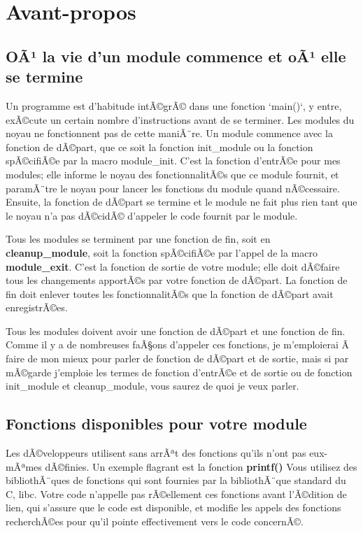 \documentclass[11pt]{article}
\begin{document}
\section*{Avant-propos}
\label{sec-5}

\subsection*{OÃ¹ la vie d'un module commence et oÃ¹ elle se termine}
\label{sec-5-1}

Un programme est d'habitude intÃ©grÃ© dans une fonction `main()`, y entre, exÃ©cute un certain nombre d'instructions avant de se terminer. Les modules du noyau ne fonctionnent pas de cette maniÃ¨re. Un module commence avec la fonction de dÃ©part, que ce soit la fonction init\_module ou la fonction spÃ©cifiÃ©e par la macro module\_init. C'est la fonction d'entrÃ©e pour mes modules; elle informe le noyau des fonctionnalitÃ©s que ce module fournit, et paramÃ¨tre le noyau pour lancer les fonctions du module quand nÃ©cessaire. Ensuite, la fonction de dÃ©part se termine et le module ne fait plus rien tant que le noyau n'a pas dÃ©cidÃ© d'appeler le code fournit par le module.

Tous les modules se terminent par une fonction de fin, soit en \textbf{cleanup\_module}, soit la fonction spÃ©cifiÃ©e par l'appel de la macro \textbf{module\_exit}. C'est la fonction de sortie de votre module; elle doit dÃ©faire tous les changements apportÃ©s par votre fonction de dÃ©part. La fonction de fin doit enlever toutes les fonctionnalitÃ©s que la fonction de dÃ©part avait enregistrÃ©es.

Tous les modules doivent avoir une fonction de dÃ©part et une fonction de fin. Comme il y a de nombreuses faÃ§ons d'appeler ces fonctions, je m'emploierai Ã  faire de mon mieux pour parler de fonction de dÃ©part et de sortie, mais si par mÃ©garde j'emploie les termes de fonction d'entrÃ©e et de sortie ou de fonction init\_module et cleanup\_module, vous saurez de quoi je veux parler.

\subsection*{Fonctions disponibles pour votre module}
\label{sec-5-2}

Les dÃ©veloppeurs utilisent sans arrÃªt des fonctions qu'ils n'ont pas eux-mÃªmes dÃ©finies. Un exemple flagrant est la fonction \textbf{printf()} Vous utilisez des bibliothÃ¨ques de fonctions qui sont fournies par la bibliothÃ¨que standard du C, libc. Votre code n'appelle pas rÃ©ellement ces fonctions avant l'Ã©dition de lien, qui s'assure que le code est disponible, et modifie les appels des fonctions recherchÃ©es pour qu'il pointe effectivement vers le code concernÃ©.
\end{document}
